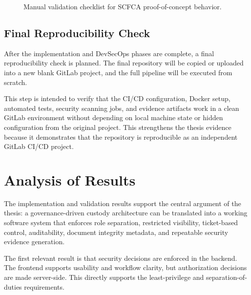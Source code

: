 \documentclass[12pt,a4paper]{report}
\begin{document}
\begin{figure}[htbp]
    \centering
    \caption{Manual validation checklist for SCFCA proof-of-concept behavior.}
    \label{fig:scfca-manual-validation-placeholder}
\end{figure}

\subsection{Final Reproducibility Check}

After the implementation and DevSecOps phases are complete, a final reproducibility check is planned. The final repository will be copied or uploaded into a new blank GitLab project, and the full pipeline will be executed from scratch.

This step is intended to verify that the CI/CD configuration, Docker setup, automated tests, security scanning jobs, and evidence artifacts work in a clean GitLab environment without depending on local machine state or hidden configuration from the original project. This strengthens the thesis evidence because it demonstrates that the repository is reproducible as an independent GitLab CI/CD project.

\section{Analysis of Results}

The implementation and validation results support the central argument of the thesis: a governance-driven custody architecture can be translated into a working software system that enforces role separation, restricted visibility, ticket-based control, auditability, document integrity metadata, and repeatable security evidence generation.

The first relevant result is that security decisions are enforced in the backend. The frontend supports usability and workflow clarity, but authorization decisions are made server-side. This directly supports the least-privilege and separation-of-duties requirements.
\end{document}
